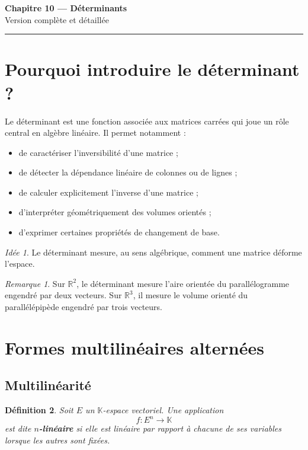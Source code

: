 \documentclass[11pt,a4paper]{article}
\newtheorem{definition}{Définition}[section]
\theoremstyle{remark}
\newtheorem{remarque}[definition]{Remarque}
\newtheorem*{idee}{Idée}
\newcommand{\R}{\mathbb{R}}
\newcommand{\K}{\mathbb{K}}
\begin{document}
\begin{center}
    {\LARGE \textbf{Chapitre 10 --- Déterminants}}\\[0.4em]
    {\large Version complète et détaillée}
\end{center}

\hrule
\vspace{1em}

\tableofcontents

\newpage

\section{Pourquoi introduire le déterminant ?}

Le déterminant est une fonction associée aux matrices carrées qui joue un rôle central en algèbre linéaire. Il permet notamment :
\begin{itemize}
    \item de caractériser l’inversibilité d’une matrice ;
    \item de détecter la dépendance linéaire de colonnes ou de lignes ;
    \item de calculer explicitement l’inverse d’une matrice ;
    \item d’interpréter géométriquement des volumes orientés ;
    \item d’exprimer certaines propriétés de changement de base.
\end{itemize}

\begin{idee}
Le déterminant mesure, au sens algébrique, comment une matrice déforme l’espace.
\end{idee}

\begin{remarque}
Sur \(\R^2\), le déterminant mesure l’aire orientée du parallélogramme engendré par deux vecteurs.  
Sur \(\R^3\), il mesure le volume orienté du parallélépipède engendré par trois vecteurs.
\end{remarque}

\section{Formes multilinéaires alternées}

\subsection{Multilinéarité}

\begin{definition}
Soit \(E\) un \(\K\)-espace vectoriel.  
Une application
\[
f:E^n\to\K
\]
est dite \textbf{\(n\)-linéaire} si elle est linéaire par rapport à chacune de ses variables lorsque les autres sont fixées.
\end{definition}
\end{document}
